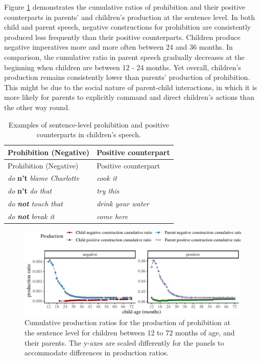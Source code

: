\documentclass[
  man,floatsintext]{apa6}
\begin{document}
Figure \ref{fig:prohibition} demonstrates the cumulative ratios of prohibition and their positive counterparts in parents' and children's production at the sentence level. In both child and parent speech, negative constructions for prohibition are consistently produced less frequently than their positive counterparts. Children produce negative imperatives more and more often between 24 and 36 months. In comparison, the cumulative ratio in parent speech gradually decreases at the beginning when children are between 12 - 24 months. Yet overall, children's production remains consistently lower than parents' production of prohibition. This might be due to the social nature of parent-child interactions, in which it is more likely for parents to explicitly command and direct children's actions than the other way round.

\begin{longtable}[]{@{}ll@{}}
\caption{\label{tab:prohibit} Examples of sentence-level prohibition and positive counterparts in children's speech.}\tabularnewline
\toprule\noalign{}
Prohibition (Negative) & Positive counterpart \\
\midrule\noalign{}
\endfirsthead
\toprule\noalign{}
Prohibition (Negative) & Positive counterpart \\
\midrule\noalign{}
\endhead
\bottomrule\noalign{}
\endlastfoot
\emph{do} \textbf{n't} \emph{blame Charlotte} & \emph{cook it} \\
\emph{do} \textbf{n't} \emph{do that} & \emph{try this} \\
\emph{do} \textbf{\emph{not}} \emph{touch that} & \emph{drink your water} \\
\emph{do} \textbf{\emph{not}} \emph{break it} & \emph{come here} \\
\end{longtable}

\begin{figure}[H]

{\centering \includegraphics{neg_construction_article_files/figure-latex/prohibition-1} 

}

\caption{Cumulative production ratios for the production of prohibition at the sentence level for children between 12 to 72 months of age, and their parents. The y-axes are scaled differently for the panels to accommodate differences in production ratios.}\label{fig:prohibition}
\end{figure}
\end{document}
